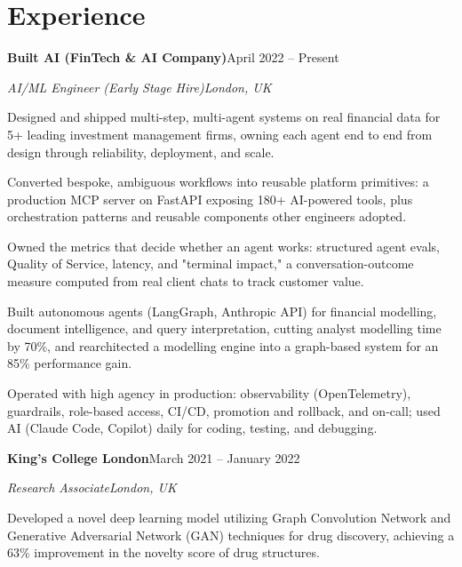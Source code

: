\documentclass[10pt,a4paper]{article}
\newcommand{\entry}[4]{%
  {\color{company}\bfseries #1}\hfill {\color{muted}#2}\par
  \vspace{1pt}
  {\itshape #3}\hfill {\color{muted}\itshape #4}\par
  \vspace{3pt}%
}
\begin{document}
\section{Experience}
\entry{Built AI (FinTech \& AI Company)}{April 2022 -- Present}{AI/ML Engineer (Early Stage Hire)}{London, UK}
\begin{tight}
  \item Designed and shipped multi-step, multi-agent systems on real financial data for 5+ leading investment management firms, owning each agent end to end from design through reliability, deployment, and scale.
  \item Converted bespoke, ambiguous workflows into reusable platform primitives: a production MCP server on FastAPI exposing 180+ AI-powered tools, plus orchestration patterns and reusable components other engineers adopted.
  \item Owned the metrics that decide whether an agent works: structured agent evals, Quality of Service, latency, and "terminal impact," a conversation-outcome measure computed from real client chats to track customer value.
  \item Built autonomous agents (LangGraph, Anthropic API) for financial modelling, document intelligence, and query interpretation, cutting analyst modelling time by 70\%, and rearchitected a modelling engine into a graph-based system for an 85\% performance gain.
  \item Operated with high agency in production: observability (OpenTelemetry), guardrails, role-based access, CI/CD, promotion and rollback, and on-call; used AI (Claude Code, Copilot) daily for coding, testing, and debugging.
\end{tight}

\entry{King's College London}{March 2021 -- January 2022}{Research Associate}{London, UK}
\begin{tight}
  \item Developed a novel deep learning model utilizing Graph Convolution Network and Generative Adversarial Network (GAN) techniques for drug discovery, achieving a 63\% improvement in the novelty score of drug structures.
\end{tight}

\end{document}
